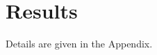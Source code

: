 \documentclass{article}
\begin{document}
\section{Results}
Details are given in the Appendix.
\end{document}
